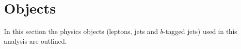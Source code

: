 


\section{Objects}
In this section the physics objects (leptons, jets and $b$-tagged jets) used in this analysis are outlined.
